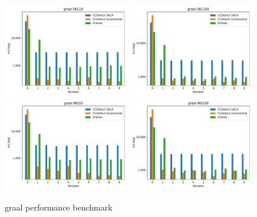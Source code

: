 \begin{figure}[H]
    \begin{center}
        \includegraphics[width=0.49\textwidth]{figures/performancegraphs/graal_DEL10.pdf}
        \includegraphics[width=0.49\textwidth]{figures/performancegraphs/graal_DEL100.pdf}
        \includegraphics[width=0.49\textwidth]{figures/performancegraphs/graal_INS10.pdf}
        \includegraphics[width=0.49\textwidth]{figures/performancegraphs/graal_INS100.pdf}
    \end{center}
    \caption{graal performance benchmark}
    \label{fig:graal}
\end{figure}


